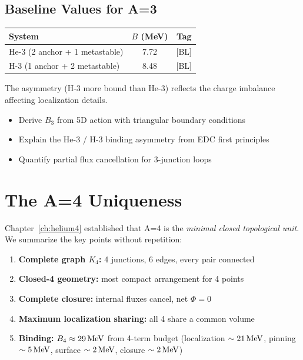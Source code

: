 \subsection{Baseline Values for A=3}

\begin{center}
\begin{tabular}{lcc}
    \toprule
    System & $B$ (MeV) & Tag \\
    \midrule
    He-3 (2 anchor + 1 metastable) & 7.72 & [BL] \\
    H-3 (1 anchor + 2 metastable) & 8.48 & [BL] \\
    \bottomrule
\end{tabular}
\end{center}

The asymmetry (H-3 more bound than He-3) reflects the charge imbalance
affecting localization details. \tagP

\begin{edcopenbox}[title=Open: A=3 Derivation]
    \begin{itemize}
        \item Derive $B_3$ from 5D action with triangular boundary conditions
        \item Explain the He-3 / H-3 binding asymmetry from EDC first principles
        \item Quantify partial flux cancellation for 3-junction loops
    \end{itemize}
    \tagOpen
\end{edcopenbox}

\section{The A=4 Uniqueness}
\label{sec:light:a4_recap}

Chapter~\ref{ch:helium4} established that A=4 is the \emph{minimal closed
topological unit}. We summarize the key points without repetition:

\begin{enumerate}
    \item \textbf{Complete graph $K_4$:} 4 junctions, 6 edges, every pair
          connected
    \item \textbf{Closed-4 geometry:} most compact arrangement for 4 points
    \item \textbf{Complete closure:} internal fluxes cancel, net $\Phi = 0$
    \item \textbf{Maximum localization sharing:} all 4 share a common volume
    \item \textbf{Binding:} $B_4 \approx 29\,\mathrm{MeV}$ from 4-term budget
          (localization $\sim 21\,\mathrm{MeV}$, pinning $\sim 5\,\mathrm{MeV}$, surface $\sim 2\,\mathrm{MeV}$,
          closure $\sim 2\,\mathrm{MeV}$)
\end{enumerate}

